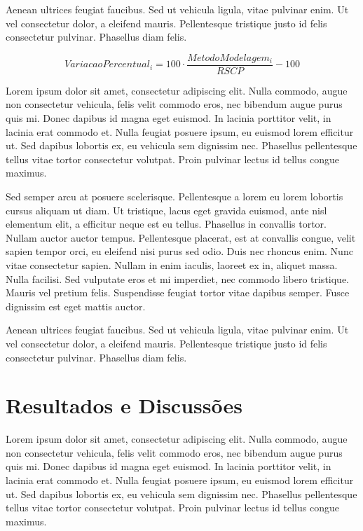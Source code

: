 \documentclass[brazil,hardcopy,openany,a4paper]{_ufscthesis}
\begin{document}
Aenean ultrices feugiat faucibus. Sed ut vehicula ligula, vitae pulvinar enim. Ut vel consectetur dolor, a eleifend mauris. Pellentesque tristique justo id felis consectetur pulvinar. Phasellus diam felis.

\begin{equation}
	\label{eq:variacaopercentual}
	VariacaoPercentual_{i} = 100 \cdot \frac{MetodoModelagem_{i}}{RSCP} - 100
\end{equation}

Lorem ipsum dolor sit amet, consectetur adipiscing elit. Nulla commodo, augue non consectetur vehicula, felis velit commodo eros, nec bibendum augue purus quis mi. Donec dapibus id magna eget euismod. In lacinia porttitor velit, in lacinia erat commodo et. Nulla feugiat posuere ipsum, eu euismod lorem efficitur ut. Sed dapibus lobortis ex, eu vehicula sem dignissim nec. Phasellus pellentesque tellus vitae tortor consectetur volutpat. Proin pulvinar lectus id tellus congue maximus.

Sed semper arcu at posuere scelerisque. Pellentesque a lorem eu lorem lobortis cursus aliquam ut diam. Ut tristique, lacus eget gravida euismod, ante nisl elementum elit, a efficitur neque est eu tellus. Phasellus in convallis tortor. Nullam auctor auctor tempus. Pellentesque placerat, est at convallis congue, velit sapien tempor orci, eu eleifend nisi purus sed odio. Duis nec rhoncus enim. Nunc vitae consectetur sapien. Nullam in enim iaculis, laoreet ex in, aliquet massa. Nulla facilisi. Sed vulputate eros et mi imperdiet, nec commodo libero tristique. Mauris vel pretium felis. Suspendisse feugiat tortor vitae dapibus semper. Fusce dignissim est eget mattis auctor.

Aenean ultrices feugiat faucibus. Sed ut vehicula ligula, vitae pulvinar enim. Ut vel consectetur dolor, a eleifend mauris. Pellentesque tristique justo id felis consectetur pulvinar. Phasellus diam felis.

\chapter{Resultados e Discussões}
\label{chapter:resultados}

Lorem ipsum dolor sit amet, consectetur adipiscing elit. Nulla commodo, augue non consectetur vehicula, felis velit commodo eros, nec bibendum augue purus quis mi. Donec dapibus id magna eget euismod. In lacinia porttitor velit, in lacinia erat commodo et. Nulla feugiat posuere ipsum, eu euismod lorem efficitur ut. Sed dapibus lobortis ex, eu vehicula sem dignissim nec. Phasellus pellentesque tellus vitae tortor consectetur volutpat. Proin pulvinar lectus id tellus congue maximus.
\end{document}
